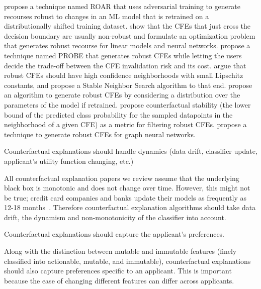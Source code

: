 \citet{upadhyay2021robust2} propose a technique named ROAR that uses adversarial training to generate recourses robust to changes in an ML model that is retrained on a distributionally shifted training dataset. 
\citet{dominiguez-olmedo-cfe-robustness} show that the CFEs that just cross the decision boundary are usually non-robust and formulate an optimization problem that generates robust recourse for linear models and neural networks. 
\citet{probabilistically-robust-cfe-hima-group} propose a technique named PROBE that generates robust CFEs while letting the users decide the trade-off between the CFE invalidation risk and its cost. 
\citet{black2022consistent-robust-cfe} argue that robust CFEs should have high confidence neighborhoods with small Lipschitz constants, and propose a Stable Neighbor Search algorithm to that end. 
\citet{nguyen2022distributionally-robustcfe} propose an algorithm to generate robust CFEs by considering a distribution over the parameters of the model if retrained. 
\citet{robustness-metric-paper-jpmorgan} propose counterfactual stability (the lower bound of the predicted class probability for the sampled datapoints in the neighborhood of a given CFE) as a metric for filtering robust CFEs. 
\citet{robust-CFE-GNN} propose a technique to generate robust CFEs for graph neural networks. 





\begin{challenge}\label{ch:dynamics}
Counterfactual explanations should handle dynamics (data drift, classifier update, applicant's utility function changing, etc.)
\end{challenge}
All counterfactual explanation papers we review assume that the underlying black box is monotonic and does not change over time. However, this might not be true; credit card companies and banks update their models as frequently as 12-18 months~\citep{bank-models}. Therefore counterfactual explanation algorithms should take data drift, the dynamism and non-monotonicity of the classifier into account. 


\begin{challenge}\label{ch:user-prefs}
Counterfactual explanations should capture the applicant's preferences. 
\end{challenge}
Along with the distinction between mutable and immutable features (finely classified into actionable, mutable, and immutable), counterfactual explanations should also capture preferences specific to an applicant. This is important because the ease of changing different features can differ across applicants. 

